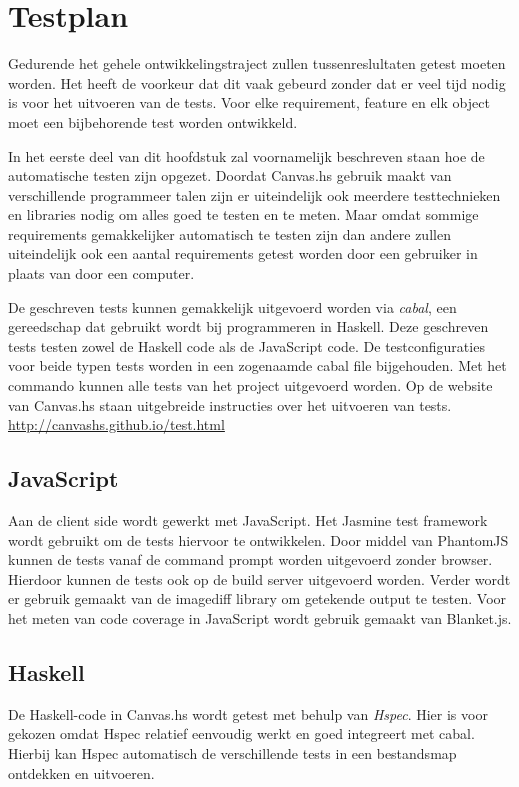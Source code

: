 \chapter{Testplan} \label{hoofdstuk:testplan}
Gedurende het gehele ontwikkelingstraject zullen tussenreslultaten getest moeten worden. Het heeft de voorkeur dat dit vaak gebeurd zonder dat er veel tijd nodig is voor het uitvoeren van de tests. Voor elke requirement, feature en elk object moet een bijbehorende test worden ontwikkeld.

In het eerste deel van dit hoofdstuk zal voornamelijk beschreven staan hoe de automatische testen zijn opgezet. Doordat Canvas.hs gebruik maakt van verschillende programmeer talen zijn er uiteindelijk ook meerdere testtechnieken en libraries nodig om alles goed te testen en te meten. Maar omdat sommige requirements gemakkelijker automatisch te testen zijn dan andere zullen uiteindelijk ook een aantal requirements getest worden door een gebruiker in plaats van door een computer.

De geschreven tests kunnen gemakkelijk uitgevoerd worden via \emph{cabal}, een gereedschap dat gebruikt wordt bij programmeren in Haskell. Deze geschreven tests testen zowel de Haskell code als de JavaScript code. De testconfiguraties voor beide typen tests worden in een zogenaamde cabal file bijgehouden. Met het commando  kunnen alle tests van het project uitgevoerd worden. Op de website van Canvas.hs staan uitgebreide instructies over het uitvoeren van tests. \url{http://canvashs.github.io/test.html}

\section{JavaScript} 
Aan de client side wordt gewerkt met JavaScript. Het Jasmine\cite{Jasmine} test framework wordt gebruikt om de tests hiervoor te ontwikkelen. Door middel van PhantomJS\cite{PhantomJS} kunnen de tests vanaf de command prompt worden uitgevoerd zonder browser. Hierdoor kunnen de tests ook op de build server uitgevoerd worden. Verder wordt er gebruik gemaakt van de imagediff\cite{imagediff} library om getekende output te testen. Voor het meten van code coverage in JavaScript wordt gebruik gemaakt van Blanket.js\cite{Blanket.js}.

\section{Haskell}
De Haskell-code in Canvas.hs wordt getest met behulp van \emph{Hspec}\cite{Hspec}. Hier is voor gekozen omdat Hspec relatief eenvoudig werkt en goed integreert met cabal. Hierbij kan Hspec automatisch de verschillende tests in een bestandsmap ontdekken en uitvoeren.

